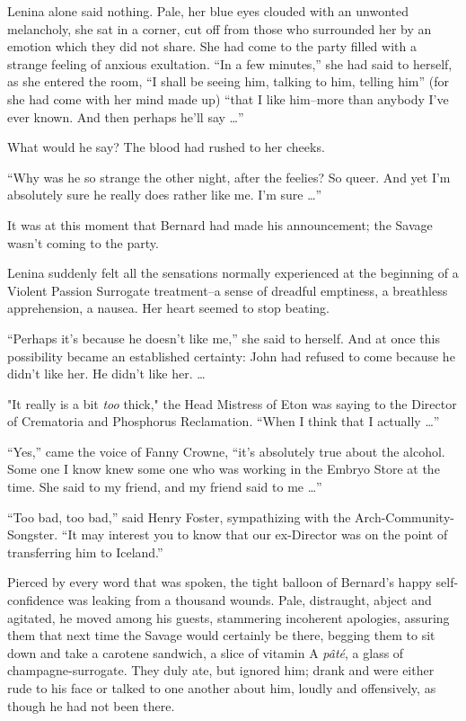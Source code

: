 \documentclass[12pt]{report}
\begin{document}
Lenina alone said nothing. Pale, her blue eyes clouded with an unwonted
melancholy, she sat in a corner, cut off from those who surrounded her
by an emotion which they did not share. She had come to the party filled
with a strange feeling of anxious exultation. ``In a few minutes,'' she
had said to herself, as she entered the room, ``I shall be seeing him,
talking to him, telling him'' (for she had come with her mind made up)
``that I like him--more than anybody I've ever known. And then perhaps
he'll say \ldots{}''

What would he say? The blood had rushed to her cheeks.

``Why was he so strange the other night, after the feelies? So queer.
And yet I'm absolutely sure he really does rather like me. I'm sure
\ldots{}''

It was at this moment that Bernard had made his announcement; the Savage
wasn't coming to the party.

Lenina suddenly felt all the sensations normally experienced at the
beginning of a Violent Passion Surrogate treatment--a sense of dreadful
emptiness, a breathless apprehension, a nausea. Her heart seemed to stop
beating.

``Perhaps it's because he doesn't like me,'' she said to herself. And at
once this possibility became an established certainty: John had refused
to come because he didn't like her. He didn't like her. \ldots{}

"It really is a bit \emph{too} thick," the Head Mistress of Eton was
saying to the Director of Crematoria and Phosphorus Reclamation. ``When
I think that I actually \ldots{}''

``Yes,'' came the voice of Fanny Crowne, ``it's absolutely true about
the alcohol. Some one I know knew some one who was working in the Embryo
Store at the time. She said to my friend, and my friend said to me
\ldots{}''

``Too bad, too bad,'' said Henry Foster, sympathizing with the
Arch-Community-Songster. ``It may interest you to know that our
ex-Director was on the point of transferring him to Iceland.''

Pierced by every word that was spoken, the tight balloon of Bernard's
happy self-confidence was leaking from a thousand wounds. Pale,
distraught, abject and agitated, he moved among his guests, stammering
incoherent apologies, assuring them that next time the Savage would
certainly be there, begging them to sit down and take a carotene
sandwich, a slice of vitamin A \emph{pâté}, a glass of
champagne-surrogate. They duly ate, but ignored him; drank and were
either rude to his face or talked to one another about him, loudly and
offensively, as though he had not been there.
\end{document}
